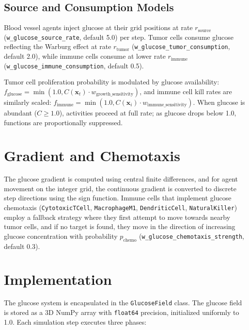 \subsection{Source and Consumption Models}

Blood vessel agents inject glucose at their grid positions at rate $r_{\text{source}}$ (\texttt{w\_glucose\_source\_rate}, default 5.0) per step. Tumor cells consume glucose reflecting the Warburg effect at rate $r_{\text{tumor}}$ (\texttt{w\_glucose\_tumor\_consumption}, default 2.0), while immune cells consume at lower rate $r_{\text{immune}}$ (\texttt{w\_glucose\_immune\_consumption}, default 0.5).

Tumor cell proliferation probability is modulated by glucose availability: $f_{\text{glucose}} = \min(1.0, C(\mathbf{x}_t) \cdot w_{\text{growth\_sensitivity}})$, and immune cell kill rates are similarly scaled: $f_{\text{immune}} = \min(1.0, C(\mathbf{x}_i) \cdot w_{\text{immune\_sensitivity}})$. When glucose is abundant ($C \geq 1.0$), activities proceed at full rate; as glucose drops below 1.0, functions are proportionally suppressed.

\section{Gradient and Chemotaxis}
\label{sec:glucose-chemotaxis}

The glucose gradient is computed using central finite differences, and for agent movement on the integer grid, the continuous gradient is converted to discrete step directions using the sign function. Immune cells that implement glucose chemotaxis (\texttt{CytotoxicTCell}, \texttt{MacrophageM1}, \texttt{DendriticCell}, \texttt{NaturalKiller}) employ a fallback strategy where they first attempt to move towards nearby tumor cells, and if no target is found, they move in the direction of increasing glucose concentration with probability $p_{\text{chemo}}$ (\texttt{w\_glucose\_chemotaxis\_strength}, default 0.3).

\section{Implementation}
\label{sec:glucose-impl}

The glucose system is encapsulated in the \texttt{GlucoseField} class. The glucose field is stored as a 3D NumPy array with \texttt{float64} precision, initialized uniformly to 1.0. Each simulation step executes three phases:

